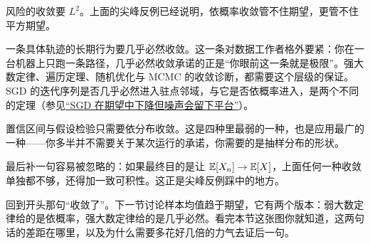 风险的收敛要 \(L^2\)。上面的尖峰反例已经说明，依概率收敛管不住期望，更管不住平方期望。

一条具体轨迹的长期行为要几乎必然收敛。这一条对数据工作者格外要紧：你在一台机器上只跑一条路径，几乎必然收敛承诺的正是``你眼前这一条就是极限''。强大数定律、遍历定理、随机优化与 MCMC 的收敛诊断，都需要这个层级的保证。SGD 的迭代序列是否几乎必然进入驻点邻域，与它是否依概率进入，是两个不同的定理（参见\hyperref[sec:09-Convex-Optimization/08-Nonconvex-and-Stochastic-Optimization/04]{``SGD 在期望中下降但噪声会留下平台''}）。

置信区间与假设检验只需要依分布收敛。这是四种里最弱的一种，也是应用最广的一种——你多半并不需要关于某次运行的承诺，你需要的是抽样分布的形状。

最后补一句容易被忽略的：如果最终目的是让 \(\mathbb{E}[X_n]\to\mathbb{E}[X]\)，上面任何一种收敛单独都不够，还得加一致可积性。这正是尖峰反例踩中的地方。

回到开头那句``收敛了''。下一节讨论样本均值趋于期望，它有两个版本：弱大数定律给的是依概率，强大数定律给的是几乎必然。看完本节这张图你就知道，这两句话的差距在哪里，以及为什么需要多花好几倍的力气去证后一句。
